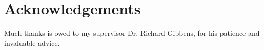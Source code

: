 \newpage
\section*{Acknowledgements}

Much thanks is owed to my supervisor Dr. Richard Gibbens, for his patience and invaluable advice.

